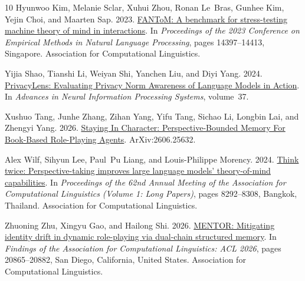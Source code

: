 \begin{thebibliography}{10}
Hyunwoo Kim, Melanie Sclar, Xuhui Zhou, Ronan Le~Bras, Gunhee Kim, Yejin Choi, and
  Maarten Sap. 2023.
\newblock \href {https://doi.org/10.18653/v1/2023.emnlp-main.890} {{FANT}o{M}:
  A benchmark for stress-testing machine theory of mind in interactions}.
\newblock In \emph{Proceedings of the 2023 Conference on Empirical Methods in
  Natural Language Processing}, pages 14397--14413, Singapore. Association for
  Computational Linguistics.

Yijia Shao, Tianshi Li, Weiyan Shi, Yanchen Liu, and Diyi Yang. 2024.
\newblock \href {https://arxiv.org/abs/2409.00138} {{PrivacyLens: Evaluating
  Privacy Norm Awareness of Language Models in Action}}.
\newblock In \emph{Advances in Neural Information Processing Systems},
  volume~37.

Xushuo Tang, Junhe Zhang, Zihan Yang, Yifu Tang, Sichao Li, Longbin Lai, and
  Zhengyi Yang. 2026.
\newblock \href {https://arxiv.org/abs/2606.25632} {{Staying In Character:
  Perspective-Bounded Memory For Book-Based Role-Playing Agents}}.
\newblock ArXiv:2606.25632.

Alex Wilf, Sihyun Lee, Paul~Pu Liang, and Louis-Philippe Morency. 2024.
\newblock \href {https://doi.org/10.18653/v1/2024.acl-long.451} {Think twice:
  Perspective-taking improves large language models' theory-of-mind
  capabilities}.
\newblock In \emph{Proceedings of the 62nd Annual Meeting of the Association
  for Computational Linguistics (Volume 1: Long Papers)}, pages 8292--8308,
  Bangkok, Thailand. Association for Computational Linguistics.

Zhuoning Zhu, Xingyu Gao, and Hailong Shi. 2026.
\newblock \href{https://doi.org/10.18653/v1/2026.findings-acl.1046}{MENTOR: Mitigating identity drift in dynamic role-playing via dual-chain structured memory}.
\newblock In \emph{Findings of the Association for Computational Linguistics: ACL 2026}, pages 20865--20882, San Diego, California, United States. Association for Computational Linguistics.

\end{thebibliography}
\appendix
\setcounter{dbltopnumber}{3}
\makeatletter
\setlength{\@fptop}{0pt}
\setlength{\@fpsep}{18pt}
\setlength{\@fpbot}{0pt plus 1fil}
\setlength{\@dblfptop}{0pt}
\setlength{\@dblfpsep}{18pt}
\setlength{\@dblfpbot}{0pt plus 1fil}
\makeatother
